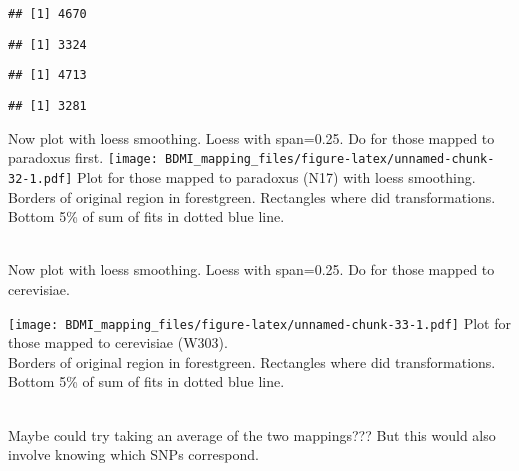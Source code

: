 \documentclass[
]{article}
\newenvironment{Shaded}{\begin{snugshade}}{\end{snugshade}}
\newcommand{\FunctionTok}[1]{\textcolor[rgb]{0.13,0.29,0.53}{\textbf{#1}}}
\newcommand{\NormalTok}[1]{#1}
\newcommand{\SpecialCharTok}[1]{\textcolor[rgb]{0.81,0.36,0.00}{\textbf{#1}}}
\begin{document}
\begin{verbatim}
## [1] 4670
\end{verbatim}

\begin{Shaded}
\end{Shaded}

\begin{verbatim}
## [1] 3324
\end{verbatim}

\begin{Shaded}
\end{Shaded}

\begin{verbatim}
## [1] 4713
\end{verbatim}

\begin{Shaded}
\end{Shaded}

\begin{verbatim}
## [1] 3281
\end{verbatim}

Now plot with loess smoothing. Loess with span=0.25. Do for those mapped
to paradoxus first.
\texttt{[image: BDMI\_mapping\_files/figure-latex/unnamed-chunk-32-1.pdf]}
Plot for those mapped to paradoxus (N17) with loess smoothing.\\
Borders of original region in forestgreen. Rectangles where did
transformations.\\
Bottom 5\% of sum of fits in dotted blue line.\\
\strut \\
Now plot with loess smoothing. Loess with span=0.25. Do for those mapped
to cerevisiae.

\texttt{[image: BDMI\_mapping\_files/figure-latex/unnamed-chunk-33-1.pdf]}
Plot for those mapped to cerevisiae (W303).\\
Borders of original region in forestgreen. Rectangles where did
transformations.\\
Bottom 5\% of sum of fits in dotted blue line.\\
\strut \\
Maybe could try taking an average of the two mappings??? But this would
also involve knowing which SNPs correspond.\\
\end{document}
